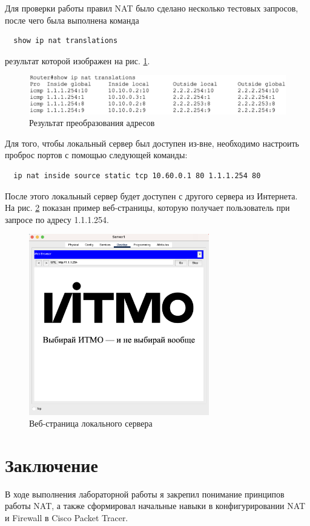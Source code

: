 \documentclass[a4paper, 14pt]{extarticle}
\begin{document}
Для проверки работы правил NAT было сделано несколько тестовых запросов, после
чего была выполнена команда
\begin{verbatim}
  show ip nat translations
\end{verbatim}
результат которой изображен на рис. \ref{fig:nat}.

\begin{figure}[H]
  \centering
  \includegraphics[width=\textwidth]{images/nat.png}
  \caption{Результат преобразования адресов}
  \label{fig:nat}
\end{figure}

Для того, чтобы локальный сервер был доступен из-вне, необходимо настроить
проброс портов с помощью следующей команды:
\begin{verbatim}
  ip nat inside source static tcp 10.60.0.1 80 1.1.1.254 80
\end{verbatim}

После этого локальный сервер будет доступен с другого сервера из Интернета. На
рис. \ref{fig:website} показан пример веб-страницы, которую получает
пользователь при запросе по адресу 1.1.1.254.

\begin{figure}[H]
  \centering
  \includegraphics[width=0.7\textwidth]{images/website.png}
  \caption{Веб-страница локального сервера}
  \label{fig:website}
\end{figure}

\section{Заключение}

В ходе выполнения лабораторной работы я закрепил понимание принципов работы NAT,
а также сформировал начальные навыки в конфигурировании NAT и Firewall в Cisco
Packet Tracer.
\end{document}
